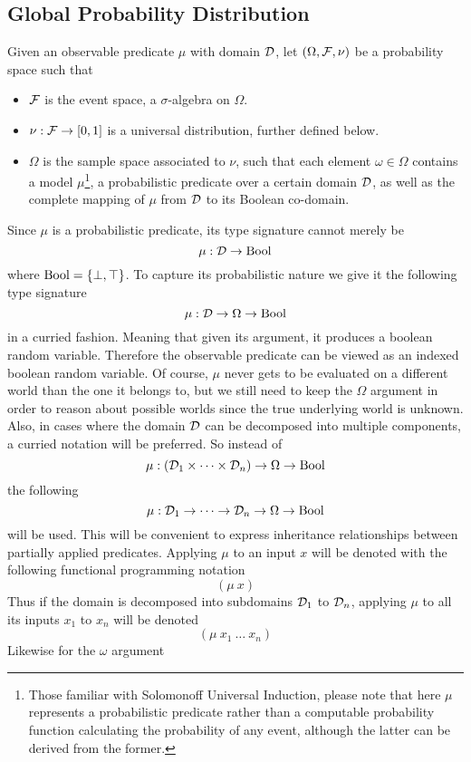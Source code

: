\documentclass[]{article}
\begin{document}
\subsection{Global Probability Distribution}
\label{sec:globalprob}
Given an observable predicate $\mu$ with domain $\mathcal{D}$, let
$(\Omega, \mathcal{F}, \nu)$ be a probability space such that
\begin{itemize}
\item $\mathcal{F}$ is the event space, a $\sigma$-algebra on $\Omega$.
\item $\nu : \mathcal{F} \to [0, 1]$ is a universal distribution, further
  defined below.
\item $\Omega$ is the sample space associated to $\nu$, such that each
  element $\omega \in \Omega$ contains a model $\mu$\footnote{Those
  familiar with Solomonoff Universal Induction, please note that here
  $\mu$ represents a probabilistic predicate rather than a computable
  probability function calculating the probability of any event,
  although the latter can be derived from the former.}, a
  probabilistic predicate over a certain domain $\mathcal{D}$, as well as
  the complete mapping of $\mu$ from $\mathcal{D}$ to its Boolean
  co-domain.
\end{itemize}
Since $\mu$ is a probabilistic predicate, its type signature cannot
merely be
$$\mu : \mathcal{D} \to \textup{Bool}$$ where $\textup{Bool} = \{\bot, \top\}$.  To capture
its probabilistic nature we give it the following type signature
$$\mu : \mathcal{D} \to \Omega \to \textup{Bool}$$ in a curried fashion.  Meaning
that given its argument, it produces a boolean random variable.
Therefore the observable predicate can be viewed as an indexed boolean
random variable.  Of course, $\mu$ never gets to be evaluated on a
different world than the one it belongs to, but we still need to keep
the $\Omega$ argument in order to reason about possible worlds since
the true underlying world is unknown.  Also, in cases where the domain
$\mathcal{D}$ can be decomposed into multiple components, a curried
notation will be preferred.  So instead of
$$\mu : (\mathcal{D}_1 \times \dots \times \mathcal{D}_n) \to \Omega \to \textup{Bool}$$
the following
$$\mu : \mathcal{D}_1 \to \dots \to \mathcal{D}_n \to \Omega \to \textup{Bool}$$ will
be used.  This will be convenient to express inheritance relationships
between partially applied predicates.  Applying $\mu$ to an input $x$
will be denoted with the following functional programming notation
$$(\mu\ x)$$ Thus if the domain is decomposed into subdomains
$\mathcal{D}_1$ to $\mathcal{D}_n$, applying $\mu$ to all its inputs $x_1$ to
$x_n$ will be denoted
$$(\mu\ x_1\ \dots\ x_n)$$ Likewise for the $\omega$ argument
\end{document}

